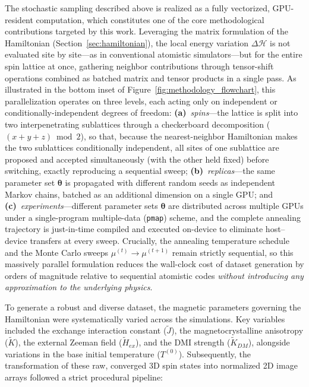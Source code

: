 \documentclass[letterpaper, 12, one column]{article}
\begin{document}
The stochastic sampling described above is realized as a fully vectorized, GPU-resident computation, which constitutes one of the core methodological contributions targeted by this work. Leveraging the matrix formulation of the Hamiltonian (Section~\ref{sec:hamiltonian}), the local energy variation $\Delta\mathcal{H}$ is not evaluated site by site---as in conventional atomistic simulators---but for the entire spin lattice at once, gathering neighbor contributions through tensor-shift operations combined as batched matrix and tensor products in a single pass. As illustrated in the bottom inset of Figure~\ref{fig:methodology_flowchart}, this parallelization operates on three levels, each acting only on independent or conditionally-independent degrees of freedom: \textbf{(a)}~\emph{spins}---the lattice is split into two interpenetrating sublattices through a checkerboard decomposition ($(x+y+z)\bmod 2$), so that, because the nearest-neighbor Hamiltonian makes the two sublattices conditionally independent, all sites of one sublattice are proposed and accepted simultaneously (with the other held fixed) before switching, exactly reproducing a sequential sweep; \textbf{(b)}~\emph{replicas}---the same parameter set $\boldsymbol{\theta}$ is propagated with different random seeds as independent Markov chains, batched as an additional dimension on a single GPU; and \textbf{(c)}~\emph{experiments}---different parameter sets $\boldsymbol{\theta}$ are distributed across multiple GPUs under a single-program multiple-data (\texttt{pmap}) scheme, and the complete annealing trajectory is just-in-time compiled and executed on-device to eliminate host--device transfers at every sweep. Crucially, the annealing temperature schedule and the Monte Carlo sweeps $\mu^{(t)}\!\to\!\mu^{(t+1)}$ remain strictly sequential, so this massively parallel formulation reduces the wall-clock cost of dataset generation by orders of magnitude relative to sequential atomistic codes \emph{without introducing any approximation to the underlying physics}.

To generate a robust and diverse dataset, the magnetic parameters governing the Hamiltonian were systematically varied across the simulations. Key variables included the exchange interaction constant ($\tilde{J}$), the magnetocrystalline anisotropy ($\tilde{K}$), the external Zeeman field ($\tilde{H}_{ex}$), and the DMI strength ($\tilde{K}_{DM}$), alongside variations in the base initial temperature ($T^{(0)}$). Subsequently, the transformation of these raw, converged 3D spin states into normalized 2D image arrays followed a strict procedural pipeline:
\end{document}

